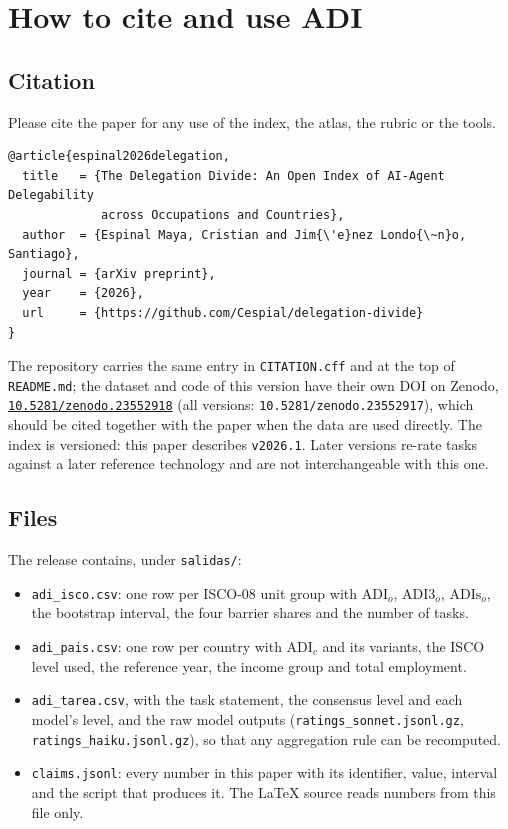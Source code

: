\section{How to cite and use ADI}
\label{app:citar}

\subsection{Citation}

Please cite the paper for any use of the index, the atlas, the rubric or the tools.
\begin{verbatim}
@article{espinal2026delegation,
  title   = {The Delegation Divide: An Open Index of AI-Agent Delegability
             across Occupations and Countries},
  author  = {Espinal Maya, Cristian and Jim{\'e}nez Londo{\~n}o, Santiago},
  journal = {arXiv preprint},
  year    = {2026},
  url     = {https://github.com/Cespial/delegation-divide}
}
\end{verbatim}
The repository carries the same entry in \texttt{CITATION.cff} and at the top of \texttt{README.md}; the dataset and code of this version have their own DOI on Zenodo, \href{https://doi.org/10.5281/zenodo.23552918}{\texttt{10.5281/zenodo.23552918}} (all versions: \texttt{10.5281/zenodo.23552917}), which should be cited together with the paper when the data are used directly.
The index is versioned: this paper describes \texttt{v2026.1}.
Later versions re-rate tasks against a later reference technology and are not interchangeable with this one.

\subsection{Files}

The release contains, under \texttt{salidas/}:
\begin{itemize}
  \item \texttt{adi\_isco.csv}: one row per ISCO-08 unit group with $\mathrm{ADI}_o$, $\mathrm{ADI3}_o$, $\mathrm{ADIs}_o$, the bootstrap interval, the four barrier shares and the number of tasks.
  \item \texttt{adi\_pais.csv}: one row per country with $\mathrm{ADI}_c$ and its variants, the ISCO level used, the reference year, the income group and total employment.
  \item \texttt{adi\_tarea.csv}, with the task statement, the consensus level and each model's level, and the raw model outputs (\texttt{ratings\_sonnet.jsonl.gz}, \texttt{ratings\_haiku.jsonl.gz}), so that any aggregation rule can be recomputed.
  \item \texttt{claims.jsonl}: every number in this paper with its identifier, value, interval and the script that produces it. The LaTeX source reads numbers from this file only.
\end{itemize}

